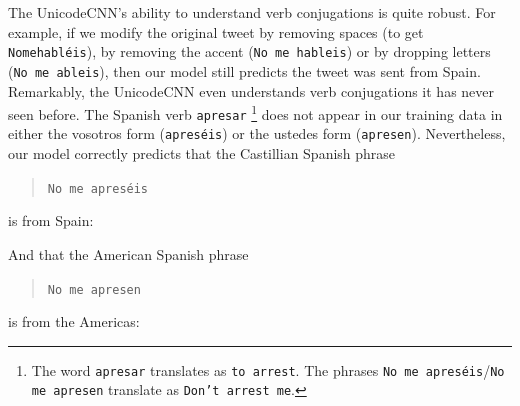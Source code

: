 \documentclass[sigconf,anonymous,review]{acmart}
\newcommand{\str}[1]{\texttt{#1}}
\begin{document}
\begin{description}
The UnicodeCNN's ability to understand verb conjugations is quite robust.
For example, if we modify the original tweet by removing spaces (to get \str{Nomehabl\'eis}),
by removing the accent (\str{No me hableis})
or by dropping letters (\str{No me ableis}),
then our model still predicts the tweet was sent from Spain.
%
%
Remarkably, the UnicodeCNN even understands verb conjugations it has never seen before.
The Spanish verb \str{apresar}%
\footnote{
    The word \str{apresar} translates as \str{to arrest}. 
    The phrases \str{No me apres\'eis}/\str{No me apresen} translate as \str{Don't arrest me}.
}
does not appear in our training data in either the vosotros form (\str{apres\'eis}) or the ustedes form (\str{apresen}).
Nevertheless, our model correctly predicts that the Castillian Spanish phrase
\begin{quote}
    \str{No me apres\'eis}%
\end{quote}
is from Spain:

\noindent

\noindent
And that the American Spanish phrase 
\begin{quote}
    \str{No me apresen}
\end{quote}
is from the Americas:

\noindent


\end{description}
\end{document}
